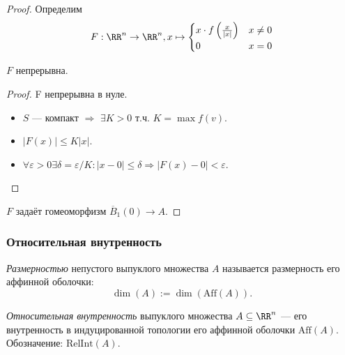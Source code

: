 \documentclass[12pt,a4paper]{article}
\newcommand{\Aff}{\ensuremath{\mathrm{Aff}}\xspace}
\newcommand{\RelInt}{\ensuremath{\mathrm{RelInt}}\xspace}
\begin{document}
\begin{proof}
        Определим
        \[
            F: \RR^n \to \RR^n, x \mapsto
            \begin{cases}
                x \cdot f\left(\frac{x}{|x|}\right)& x \neq 0\\
                0& x = 0
            \end{cases}
        \]

        \begin{thlemma}
            $F$ непрерывна.
        \end{thlemma}

        \begin{proof}
            F непрерывна в нуле.
            \begin{itemize}
                \item $S$ --- компакт $\Rightarrow$ $\exists K > 0$ т.ч. $K = \max f(v)$.
                \item $|F(x)| \leqslant K|x|$.
                \item $\forall \varepsilon > 0 \exists \delta = \varepsilon/K: |x-0| \leqslant \delta \Rightarrow |F(x) - 0| < \varepsilon$.
            \end{itemize}

        \end{proof}


        $F$ задаёт гомеоморфизм $\overline{B}_1(0) \to A$.
    \end{proof}

    \subsubsection{Относительная внутренность}

    \begin{definition}
        \emph{Размерностью} непустого выпуклого множества $A$ называется размерность его аффинной оболочки:
        \[\dim(A) := \dim(\Aff(A)).\]
    \end{definition}

    \begin{definition}
        \emph{Относительная внутренность} выпуклого множества $A \subseteq \RR^n$ --- его внутренность в индуцированной топологии его аффинной оболочки $\Aff(A)$. Обозначение: $\RelInt(A)$.
    \end{definition}
\end{document}
